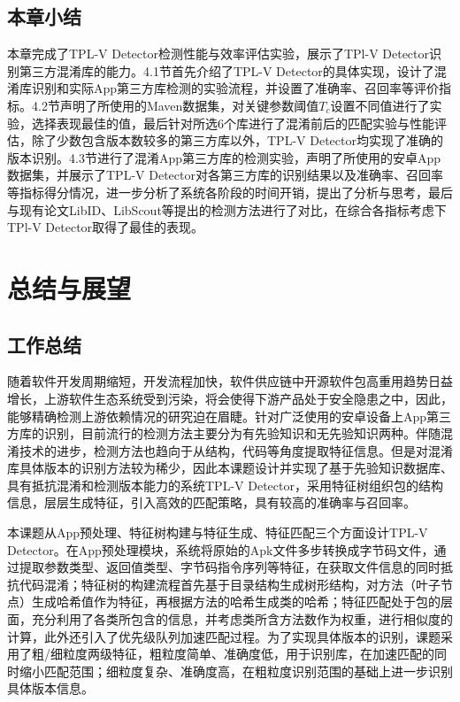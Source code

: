 \section{本章小结}
本章完成了TPL-V Detector检测性能与效率评估实验，展示了TPl-V Detector识别第三方混淆库的能力。4.1节首先介绍了TPL-V Detector的具体实现，设计了混淆库识别和实际App第三方库检测的实验流程，并设置了准确率、召回率等评价指标。4.2节声明了所使用的Maven数据集，对关键参数阈值$T_c$设置不同值进行了实验，选择表现最佳的值，最后针对所选6个库进行了混淆前后的匹配实验与性能评估，除了少数包含版本数较多的第三方库以外，TPL-V Detector均实现了准确的版本识别。4.3节进行了混淆App第三方库的检测实验，声明了所使用的安卓App数据集，并展示了TPL-V Detector对各第三方库的识别结果以及准确率、召回率等指标得分情况，进一步分析了系统各阶段的时间开销，提出了分析与思考，最后与现有论文LibID、LibScout等提出的检测方法进行了对比，在综合各指标考虑下TPl-V Detector取得了最佳的表现。


\chapter{总结与展望}

\section{工作总结}
随着软件开发周期缩短，开发流程加快，软件供应链中开源软件包高重用趋势日益增长，上游软件生态系统受到污染，将会使得下游产品处于安全隐患之中，因此，能够精确检测上游依赖情况的研究迫在眉睫。针对广泛使用的安卓设备上App第三方库的识别，目前流行的检测方法主要分为有先验知识和无先验知识两种。伴随混淆技术的进步，检测方法也趋向于从结构，代码等角度提取特征信息。但是对混淆库具体版本的识别方法较为稀少，因此本课题设计并实现了基于先验知识数据库、具有抵抗混淆和检测版本能力的系统TPL-V Detector，采用特征树组织包的结构信息，层层生成特征，引入高效的匹配策略，具有较高的准确率与召回率。


本课题从App预处理、特征树构建与特征生成、特征匹配三个方面设计TPL-V Detector。在App预处理模块，系统将原始的Apk文件多步转换成字节码文件，通过提取参数类型、返回值类型、字节码指令序列等特征，在获取文件信息的同时抵抗代码混淆；特征树的构建流程首先基于目录结构生成树形结构，对方法（叶子节点）生成哈希值作为特征，再根据方法的哈希生成类的哈希；特征匹配处于包的层面，充分利用了各类所包含的信息，并考虑类所含方法数作为权重，进行相似度的计算，此外还引入了优先级队列加速匹配过程。为了实现具体版本的识别，课题采用了粗/细粒度两级特征，粗粒度简单、准确度低，用于识别库，在加速匹配的同时缩小匹配范围；细粒度复杂、准确度高，在粗粒度识别范围的基础上进一步识别具体版本信息。


